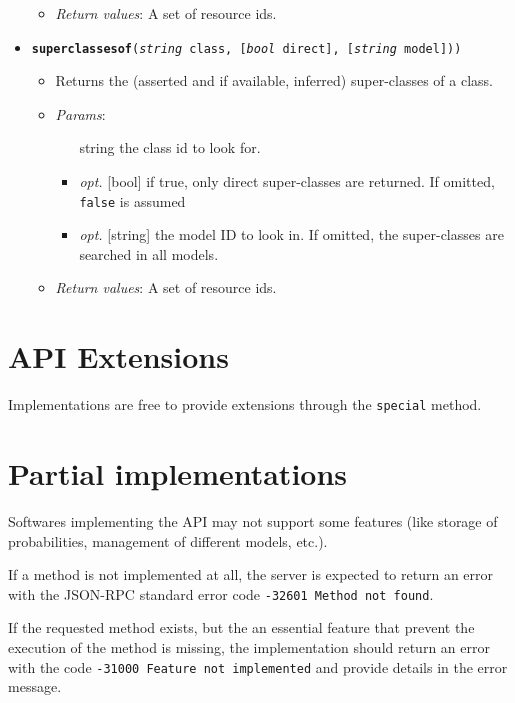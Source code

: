 \begin{itemize}
\begin{itemize}
\item  \emph{Return values}: A set of resource ids.
\end{itemize}

\item  \texttt{\textbf{superclassesof}(\emph{string} class, [\emph{bool} direct], [\emph{string} model]))}
\begin{itemize}
\item  Returns the (asserted and if available, inferred) super-classes of a class.
\item  \emph{Params}:
\begin{itemize}
\item  [string] the class id to look for.
\item  \emph{opt.} [bool] if true, only direct super-classes are returned. If omitted, \texttt{false} is assumed 
\item  \emph{opt.} [string] the model ID to look in. If omitted, the super-classes are searched in all models. 
\end{itemize}

\item  \emph{Return values}: A set of resource ids.
\end{itemize}

\end{itemize}

\section{API Extensions}


Implementations are free to provide extensions through the \texttt{special} method.


\section{Partial implementations}


Softwares implementing the API may not support some features (like storage of probabilities, management of different models, etc.).

If a method is not implemented at all, the server is expected to return an error with the JSON-RPC standard error code \texttt{-32601 Method not found}.

If the requested method exists, but the an essential feature that prevent the execution of the method is missing, the implementation should return an error with the code \texttt{-31000 Feature not implemented} and provide details in the error message.

